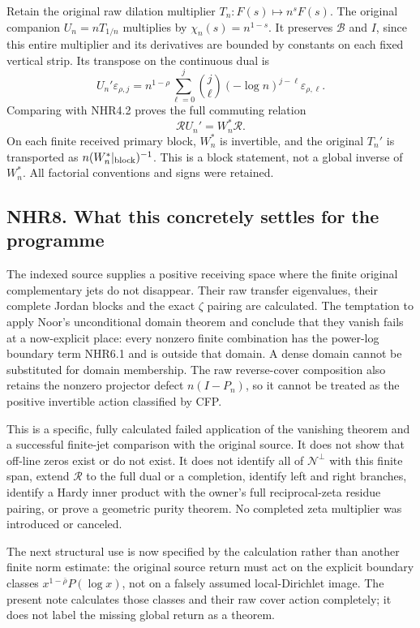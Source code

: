 Retain the original raw dilation multiplier \(T_n:F(s)\mapsto n^sF(s)\).
The original companion \(U_n=nT_{1/n}\) multiplies by
\(\chi_n(s)=n^{1-s}\). It preserves \(\mathcal B\) and \(I\), since this
entire multiplier and its derivatives are bounded by constants on each
fixed vertical strip. Its transpose on the continuous dual is \[
 U_n'\varepsilon_{\rho,j}
 =n^{1-\rho}\sum_{\ell=0}^j\binom j\ell(-\log n)^{j-\ell}\varepsilon_{\rho,\ell}.
\] Comparing with NHR4.2 proves the full commuting relation \[
 \boxed{\mathcal R U_n'=W_n^*\mathcal R.}
 \tag{NHR7.2}
\] On each finite received primary block, \(W_n^*\) is invertible, and
the original \(T_n'\) is transported as \(n(W_n^*|_{\rm block})^{-1}\).
This is a block statement, not a global inverse of \(W_n^*\). All
factorial conventions and signs were retained.

\subsection{NHR8. What this concretely settles for the
programme}\label{nhr8.-what-this-concretely-settles-for-the-programme}

The indexed source supplies a positive receiving space where the finite
original complementary jets do not disappear. Their raw transfer
eigenvalues, their complete Jordan blocks and the exact \(\zeta\)
pairing are calculated. The temptation to apply Noor's unconditional
domain theorem and conclude that they vanish fails at a now-explicit
place: every nonzero finite combination has the power-log boundary term
NHR6.1 and is outside that domain. A dense domain cannot be substituted
for domain membership. The raw reverse-cover composition also retains
the nonzero projector defect \(n(I-P_n)\), so it cannot be treated as
the positive invertible action classified by CFP.

This is a specific, fully calculated failed application of the vanishing
theorem and a successful finite-jet comparison with the original source.
It does not show that off-line zeros exist or do not exist. It does not
identify all of \(\mathcal N^\perp\) with this finite span, extend
\(\mathcal R\) to the full dual or a completion, identify left and right
branches, identify a Hardy inner product with the owner's full
reciprocal-zeta residue pairing, or prove a geometric purity theorem. No
completed zeta multiplier was introduced or canceled.

The next structural use is now specified by the calculation rather than
another finite norm estimate: the original source return must act on the
explicit boundary classes \(x^{1-\bar\rho}P(\log x)\), not on a falsely
assumed local-Dirichlet image. The present note calculates those classes
and their raw cover action completely; it does not label the missing
global return as a theorem.

